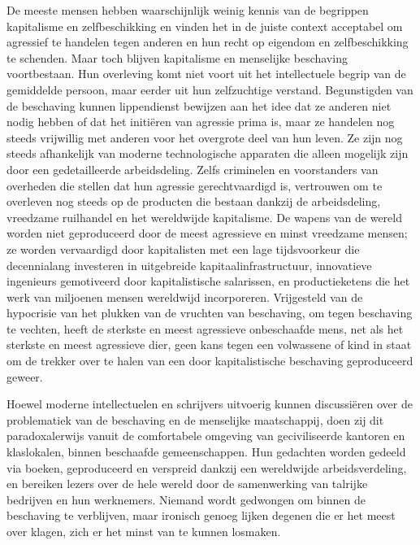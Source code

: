 \documentclass[
  a5paper,
  smalldemyvopaper,11pt,twoside,onecolumn,openright,extrafontsizes,
hidelinks]{memoir}
\begin{document}
De meeste mensen hebben waarschijnlijk weinig kennis van de begrippen
kapitalisme en zelfbeschikking en vinden het in de juiste context
acceptabel om agressief te handelen tegen anderen en hun recht op
eigendom en zelfbeschikking te schenden. Maar toch blijven kapitalisme
en menselijke beschaving voortbestaan. Hun overleving komt niet voort
uit het intellectuele begrip van de gemiddelde persoon, maar eerder uit
hun zelfzuchtige verstand. Begunstigden van de beschaving kunnen
lippendienst bewijzen aan het idee dat ze anderen niet nodig hebben of
dat het initiëren van agressie prima is, maar ze handelen nog steeds
vrijwillig met anderen voor het overgrote deel van hun leven. Ze zijn
nog steeds afhankelijk van moderne technologische apparaten die alleen
mogelijk zijn door een gedetailleerde arbeidsdeling. Zelfs criminelen en
voorstanders van overheden die stellen dat hun agressie gerechtvaardigd
is, vertrouwen om te overleven nog steeds op de producten die bestaan
dankzij de arbeidsdeling, vreedzame ruilhandel en het wereldwijde
kapitalisme. De wapens van de wereld worden niet geproduceerd door de
meest agressieve en minst vreedzame mensen; ze worden vervaardigd door
kapitalisten met een lage tijdsvoorkeur die decennialang investeren in
uitgebreide kapitaalinfrastructuur, innovatieve ingenieurs gemotiveerd
door kapitalistische salarissen, en productieketens die het werk van
miljoenen mensen wereldwijd incorporeren. Vrijgesteld van de hypocrisie
van het plukken van de vruchten van beschaving, om tegen beschaving te
vechten, heeft de sterkste en meest agressieve onbeschaafde mens, net
als het sterkste en meest agressieve dier, geen kans tegen een
volwassene of kind in staat om de trekker over te halen van een door
kapitalistische beschaving geproduceerd geweer.

Hoewel moderne intellectuelen en schrijvers uitvoerig kunnen
discussiëren over de problematiek van de beschaving en de menselijke
maatschappij, doen zij dit paradoxalerwijs vanuit de comfortabele
omgeving van geciviliseerde kantoren en klaslokalen, binnen beschaafde
gemeenschappen. Hun gedachten worden gedeeld via boeken, geproduceerd en
verspreid dankzij een wereldwijde arbeidsverdeling, en bereiken lezers
over de hele wereld door de samenwerking van talrijke bedrijven en hun
werknemers. Niemand wordt gedwongen om binnen de beschaving te
verblijven, maar ironisch genoeg lijken degenen die er het meest over
klagen, zich er het minst van te kunnen losmaken.
\end{document}
